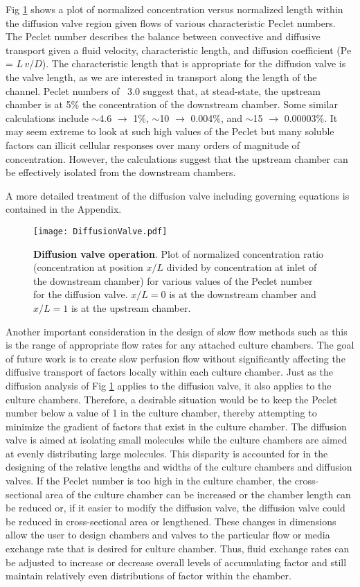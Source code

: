 Fig \ref{fig:pecletFlow} shows a plot of normalized concentration versus normalized length within the diffusion valve region given flows of various characteristic Peclet numbers. The Peclet number describes the balance between convective and diffusive transport given a fluid velocity, characteristic length, and diffusion coefficient (Pe = $L\,v/D$). The characteristic length that is appropriate for the diffusion valve is the valve length, as we are interested in transport along the length of the channel. Peclet numbers of ~3.0 suggest that, at stead-state, the upstream chamber is at 5\% the concentration of the downstream chamber. Some similar calculations include $\sim$4.6 $\rightarrow$ 1\%, $\sim$10 $\rightarrow$ 0.004\%, and $\sim$15 $\rightarrow$ 0.00003\%. It may seem extreme to look at such high values of the Peclet but many soluble factors can illicit cellular responses over many orders of magnitude of concentration. However, the calculations suggest that the upstream chamber can be effectively isolated from the downstream chambers.

A more detailed treatment of the diffusion valve including governing equations is contained in the Appendix.

\begin{figure}[!ht]
\centering
\texttt{[image: DiffusionValve.pdf]}
\caption{\textbf{Diffusion valve operation}. Plot of normalized concentration ratio (concentration at position $x/L$ divided by concentration at inlet of the downstream chamber) for various values of the Peclet number for the diffusion valve. $x/L=0$ is at the downstream chamber and $x/L=1$ is at the upstream chamber.}
\label{fig:pecletFlow}
\end{figure}

Another important consideration in the design of slow flow methods such as this is the range of appropriate flow rates for any attached culture chambers. The goal of future work is to create slow perfusion flow without significantly affecting the diffusive transport of factors locally within each culture chamber. Just as the diffusion analysis of Fig \ref{fig:pecletFlow} applies to the diffusion valve, it also applies to the culture chambers. Therefore, a desirable situation would be to keep the Peclet number below a value of 1 in the culture chamber, thereby attempting to minimize the gradient of factors that exist in the culture chamber. The diffusion valve is aimed at isolating small molecules while the culture chambers are aimed at evenly distributing large molecules. This disparity is accounted for in the designing of the relative lengths and widths of the culture chambers and diffusion valves. If the Peclet number is too high in the culture chamber, the cross-sectional area of the culture chamber can be increased or the chamber length can be reduced or, if it easier to modify the diffusion valve, the diffusion valve could be reduced in cross-sectional area or lengthened. These changes in dimensions allow the user to design chambers and valves to the particular flow or media exchange rate that is desired for culture chamber. Thus, fluid exchange rates can be adjusted to increase or decrease overall levels of accumulating factor and still maintain relatively even distributions of factor within the chamber.

